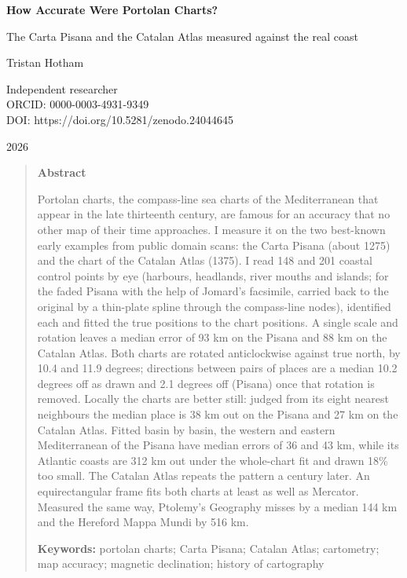 \documentclass[11pt,a4paper]{article}
\begin{document}
\begin{center}
{\Large\bfseries How Accurate Were Portolan Charts?\par}
\vspace{0.4em}
{\large The Carta Pisana and the Catalan Atlas measured against the real coast\par}
\vspace{1.2em}
{\large Tristan Hotham\par}
\vspace{0.3em}
{\small Independent researcher\\
ORCID: 0000-0003-4931-9349\\
DOI: https://doi.org/10.5281/zenodo.24044645\par}
\vspace{0.8em}
2026
\end{center}

\begin{quote}
\small
\begin{center}\textbf{Abstract}\end{center}
Portolan charts, the compass-line sea charts of the Mediterranean that appear in the late thirteenth century, are famous for an accuracy that no other map of their time approaches. I measure it on the two best-known early examples from public domain scans: the Carta Pisana (about 1275) and the chart of the Catalan Atlas (1375). I read 148 and 201 coastal control points by eye (harbours, headlands, river mouths and islands; for the faded Pisana with the help of Jomard's facsimile, carried back to the original by a thin-plate spline through the compass-line nodes), identified each and fitted the true positions to the chart positions. A single scale and rotation leaves a median error of 93 km on the Pisana and 88 km on the Catalan Atlas. Both charts are rotated anticlockwise against true north, by 10.4 and 11.9 degrees; directions between pairs of places are a median 10.2 degrees off as drawn and 2.1 degrees off (Pisana) once that rotation is removed. Locally the charts are better still: judged from its eight nearest neighbours the median place is 38 km out on the Pisana and 27 km on the Catalan Atlas. Fitted basin by basin, the western and eastern Mediterranean of the Pisana have median errors of 36 and 43 km, while its Atlantic coasts are 312 km out under the whole-chart fit and drawn 18\% too small. The Catalan Atlas repeats the pattern a century later. An equirectangular frame fits both charts at least as well as Mercator. Measured the same way, Ptolemy's Geography misses by a median 144 km and the Hereford Mappa Mundi by 516 km.

\textbf{Keywords:} portolan charts; Carta Pisana; Catalan Atlas; cartometry; map accuracy; magnetic declination; history of cartography
\end{quote}
\end{document}
